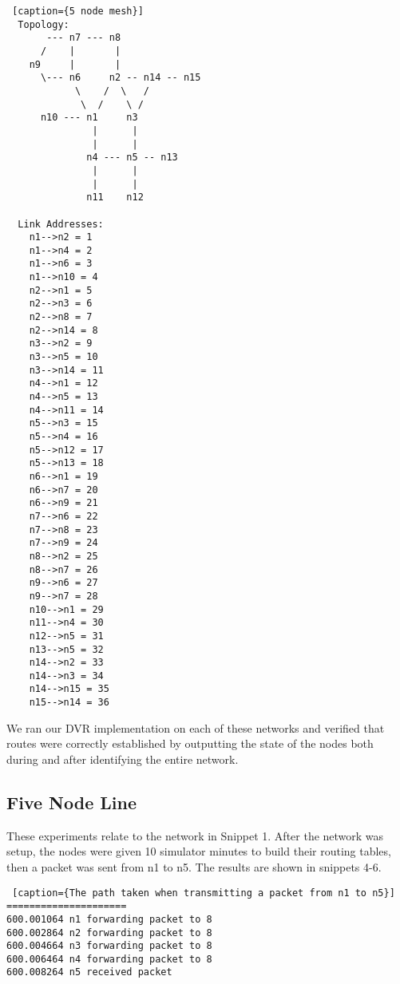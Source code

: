\documentclass[11pt]{article}
\begin{document}
\begin{lstlisting} [caption={5 node mesh}]
  Topology:
       --- n7 --- n8
      /    |       |
    n9     |       |
      \--- n6     n2 -- n14 -- n15
            \    /  \   /
             \  /    \ /
      n10 --- n1     n3
               |      |
               |      |
              n4 --- n5 -- n13
               |      |
               |      |
              n11    n12

  Link Addresses:
    n1-->n2 = 1 
    n1-->n4 = 2
    n1-->n6 = 3
    n1-->n10 = 4
    n2-->n1 = 5
    n2-->n3 = 6
    n2-->n8 = 7
    n2-->n14 = 8
    n3-->n2 = 9
    n3-->n5 = 10
    n3-->n14 = 11
    n4-->n1 = 12
    n4-->n5 = 13
    n4-->n11 = 14
    n5-->n3 = 15
    n5-->n4 = 16
    n5-->n12 = 17
    n5-->n13 = 18
    n6-->n1 = 19
    n6-->n7 = 20
    n6-->n9 = 21
    n7-->n6 = 22
    n7-->n8 = 23
    n7-->n9 = 24
    n8-->n2 = 25
    n8-->n7 = 26
    n9-->n6 = 27
    n9-->n7 = 28
    n10-->n1 = 29
    n11-->n4 = 30
    n12-->n5 = 31
    n13-->n5 = 32
    n14-->n2 = 33
    n14-->n3 = 34
    n14-->n15 = 35
    n15-->n14 = 36

\end{lstlisting}

We ran our DVR implementation on each of these networks and verified that routes were correctly established by outputting the state of the nodes both during and after identifying the entire network.

\subsection{Five Node Line}

These experiments relate to the network in Snippet 1. After the network was setup, the nodes were given 10 simulator minutes to build their routing tables, then a packet was sent from n1 to n5. The results are shown in snippets 4-6.

 \begin{lstlisting} [caption={The path taken when transmitting a packet from n1 to n5}]
=====================
600.001064 n1 forwarding packet to 8
600.002864 n2 forwarding packet to 8
600.004664 n3 forwarding packet to 8
600.006464 n4 forwarding packet to 8
600.008264 n5 received packet
\end{lstlisting}
\end{document}
